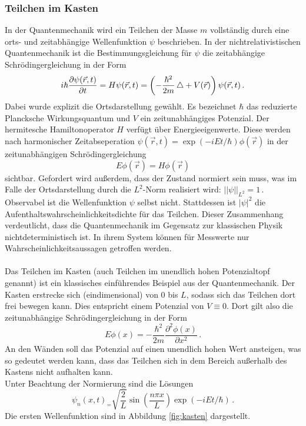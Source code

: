 \subsubsection{Teilchen im Kasten}
\label{subsubsec:kasten}
In der Quantenmechanik wird ein Teilchen der Masse $m$ vollständig durch eine orts- und zeitabhängige Wellenfunktion $\psi$ beschrieben. In der nichtrelativistischen Quantenmechanik ist die Bestimmungsgleichung für $\psi$ die zeitabhängige Schrödingergleichung in der Form
\begin{equation}
  i \hbar \frac{\partial \psi(\vec{r},t)}{\partial t} = H \psi(\vec{r},t) = \left(- \frac{\hbar^2}{2 m} \mathop{}\!\mathbin\bigtriangleup + V(\vec{r})\right) \psi(\vec{r},t)\,.
  \label{eqn:schroedingerZeitabhaengig}
\end{equation}
Dabei wurde explizit die Ortsdarstellung gewählt. Es bezeichnet $\hbar$ das reduzierte Plancksche Wirkungsquantum und $V$ ein zeitunabhängiges Potenzial. Der hermitesche Hamiltonoperator $H$ verfügt über Energieeigenwerte. Diese werden nach harmonischer Zeitabseperation $\psi(\vec{r},t) = \exp(-i E t / \hbar) \phi(\vec{r})$ in der zeitunabhängigen Schrödingergleichung
\begin{equation}
  E \phi(\vec{r}) = H \phi(\vec{r})
  \label{eqn:schroedingerZeitunabhaengig}
\end{equation}
sichtbar. Gefordert wird außerdem, dass der Zustand normiert sein muss, was im Falle der Ortsdarstellung durch die $L^2$-Norm realisiert wird: $\lvert\lvert \psi \rvert\rvert_{L^2} = 1\,.$ Observabel ist die Wellenfunktion $\psi$ selbst nicht. Stattdessen ist $\lvert \psi \rvert ^2$ die Aufenthaltswahrscheinlichkeitsdichte für das Teilchen. Dieser Zusammenhang verdeutlicht, dass die Quantenmechanik im Gegensatz zur klassischen Physik nichtdeterministisch ist. In ihrem System können für Messwerte nur Wahrscheinlichkeitsaussagen getroffen werden.
\\\\
Das Teilchen im Kasten (auch Teilchen im unendlich hohen Potenzialtopf genannt) ist ein klassisches einführendes Beispiel aus der Quantenmechanik. Der Kasten erstrecke sich (eindimensional) von 0 bis $L$, sodass sich das Teilchen dort frei bewegen kann. Dies entspricht einem Potenzial von $V \equiv 0$. Dort gilt also die zeitunabhängige Schrödingergleichung in der Form
\begin{equation}
  E \phi(x) = - \frac{\hbar^2}{2 m}  \frac{\partial^2 \phi(x)} {\partial x^2} \,.
  \label{eqn:schroedingerKasten}
\end{equation}
An den Wänden soll das Potenzial auf einen unendlich hohen Wert ansteigen, was so gedeutet werden kann, dass das Teilchen sich in dem Bereich außerhalb des Kastens nicht aufhalten kann.\\
Unter Beachtung der Normierung sind die Lösungen
\begin{equation}
  \psi_n(x,t)_ = \sqrt{\frac{2}{L}} \sin\left(\frac{n \pi x}{L}\right) \exp(-i E t / \hbar)\,.
  \label{eqn:kastenLoesung}
\end{equation}
Die ersten Wellenfunktion sind in Abbildung \ref{fig:kasten} dargestellt.

